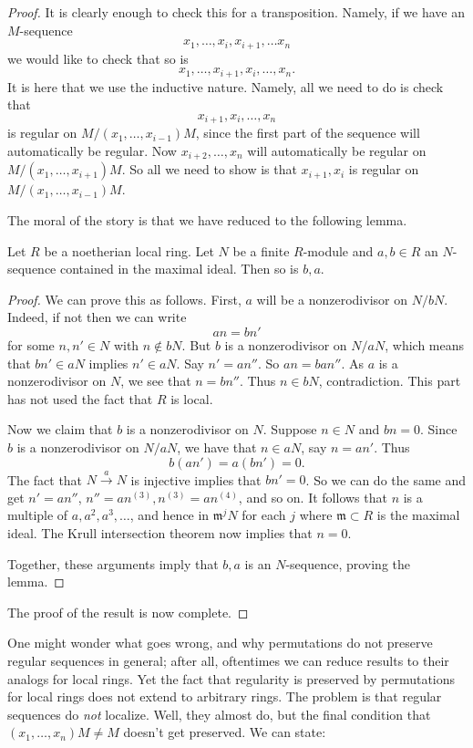 \begin{proof} 
It is clearly enough to check this for a transposition. Namely, if we have an
$M$-sequence
\[ x_1, \dots, x_i, x_{i+1}, \dots x_n  \]
we would like to check that so is
\[ x_1, \dots, x_{i+1}, x_i, \dots, x_n.  \]
It is here that we use the inductive nature. Namely, all we need to do is check
that
\[ x_{i+1}, x_i, \dots,x_n  \]
is regular on $M/(x_1, \dots,x_{i-1}) M$, since the first part of the sequence
will automatically be regular. Now $x_{i+2}, \dots, x_n$ will automatically be
regular on $M/(x_1, \dots, x_{i+1})M$. So all we need to show is that
$x_{i+1}, x_i$ is regular on $M/(x_1, \dots, x_{i-1})M$.

The moral of the story is that we have reduced to the following lemma.

\begin{lemma} 
Let $R$ be a noetherian local ring. Let $N$
be a finite $R$-module and 
$a,b \in R$ an $N$-sequence contained in the maximal ideal. Then so is $b,a$.
\end{lemma} 
\begin{proof}
We can prove this as follows. First, $a$ will be a nonzerodivisor on $N/bN$.
Indeed, if not then we can write
\[ an = bn'  \]
for some $n,n' \in N$ with $n \notin bN$. But $b$ is a nonzerodivisor on
$N/aN$, which means that $bn' \in aN$ implies $n' \in aN$. Say $n' = an''$. So
$an = ba n''$. As $a$ is a nonzerodivisor on $N$, we see that $n = bn''$. Thus
$n \in bN$, contradiction.
This part has not used the fact that $R$ is local.

Now we claim that $b$ is a nonzerodivisor on $N$. Suppose $n \in N$ and $bn =
0$. Since $b$ is a nonzerodivisor on $N/aN$, we have that $n \in aN$, say $n =
an'$. Thus 
\[ b(an') = a(bn') = 0.  \]
The fact that $N \stackrel{a}{\to} N$ is injective implies that $bn' = 0$. So
we can do the same and get $n' = an''$, $n'' = a n^{(3)}, n^{(3)} =a n^{(4)}$, and
so on. It follows that $n$ is a multiple of $a, a^2,a^3, \dots$, and hence in
$\mathfrak{m}^j N$ for each $j$ where $\mathfrak{m} \subset R$ is the maximal
ideal. The Krull intersection theorem now implies that $n = 0$. 

Together, these arguments imply that $b,a$ is an $N$-sequence, proving the
lemma.
\end{proof} 
The proof of the result is now complete.
\end{proof}


One might wonder what goes wrong, and why permutations do not preserve
regular sequences in general; after all, oftentimes we can reduce results
to their analogs for local rings. Yet the fact that regularity is preserved by
permutations for local rings does not extend to arbitrary rings.
The problem is that regular sequences do \emph{not} localize. Well, they almost
do, but the final condition that $(x_1, \dots, x_n) M \neq M$ doesn't get
preserved.
We can state:

